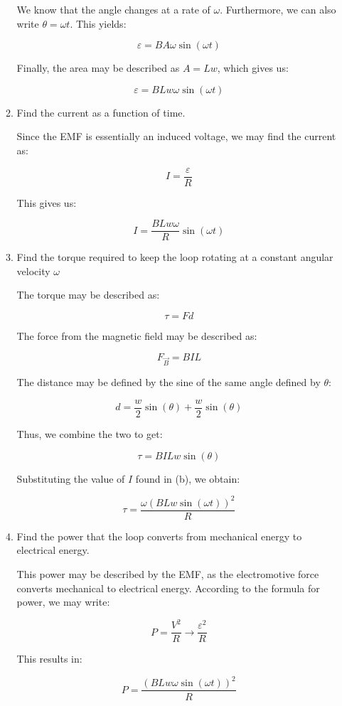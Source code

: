 \begin{enumerate}
\begin{enumerate}
        We know that the angle changes at a rate of $\omega$. Furthermore, we can also write $\theta=\omega t$. This yields:

        $$\varepsilon=BA\omega\sin(\omega t)$$

        Finally, the area may be described as $A=Lw$, which gives us:

        $$\boxed{\varepsilon=BLw\omega\sin(\omega t)}$$

      \item Find the current as a function of time.

        Since the EMF is essentially an induced voltage, we may find the current as:

        $$I=\frac{\varepsilon}{R}$$

        This gives us:

        $$\boxed{I=\frac{BLw\omega}{R}\sin(\omega t)}$$

      \item Find the torque required to keep the loop rotating at a constant angular velocity $\omega$

        The torque may be described as:

        $$\tau=Fd$$

        The force from the magnetic field may be described as:

        $$F_{\vec{B}}=BIL$$

        The distance may be defined by the sine of the same angle defined by $\theta$:

        $$d=\frac{w}{2}\sin(\theta)+\frac{w}{2}\sin(\theta)$$

        Thus, we combine the two to get:

        $$\tau=BILw\sin(\theta)$$

        Substituting the value of $I$ found in (b), we obtain:

        $$\boxed{\tau=\frac{\omega(BLw\sin(\omega t))^2}{R}}$$

      \item Find the power that the loop converts from mechanical energy to electrical energy.

        This power may be described by the EMF, as the electromotive force converts mechanical to electrical energy. According to the formula for power, we may write:

        $$P=\frac{V^2}{R}\to\frac{\varepsilon^2}{R}$$

        This results in:

        $$\boxed{P=\frac{(BLw\omega\sin(\omega t))^2}{R}}$$


\end{enumerate}
\end{enumerate}
